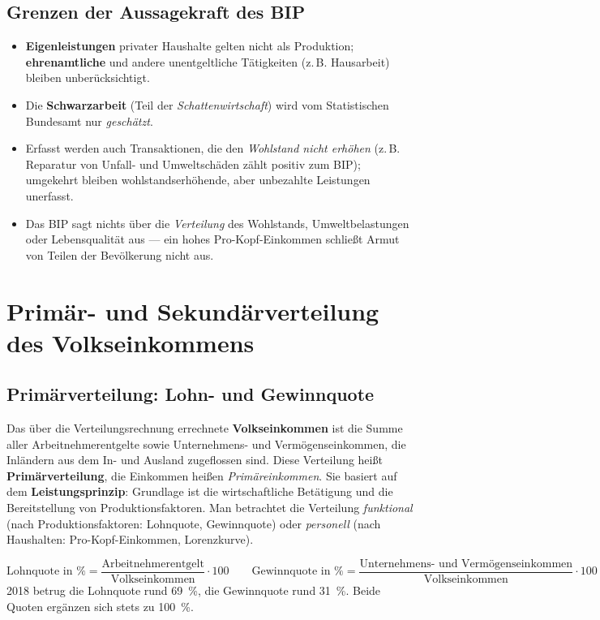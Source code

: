 \documentclass[11pt, a4paper]{article}
\begin{document}
\subsection{Grenzen der Aussagekraft des BIP}

\begin{itemize}
  \item \textbf{Eigenleistungen} privater Haushalte gelten nicht als Produktion;
    \textbf{ehrenamtliche} und andere unentgeltliche Tätigkeiten (z.\,B. Hausarbeit)
    bleiben unberücksichtigt.
  \item Die \textbf{Schwarzarbeit} (Teil der \emph{Schattenwirtschaft}) wird vom
    Statistischen Bundesamt nur \emph{geschätzt}.
  \item Erfasst werden auch Transaktionen, die den \emph{Wohlstand nicht erhöhen} (z.\,B.
    Reparatur von Unfall- und Umweltschäden zählt positiv zum BIP); umgekehrt bleiben
    wohlstandserhöhende, aber unbezahlte Leistungen unerfasst.
  \item Das BIP sagt nichts über die \emph{Verteilung} des Wohlstands, Umweltbelastungen
    oder Lebensqualität aus --- ein hohes Pro-Kopf-Einkommen schließt Armut von Teilen
    der Bevölkerung nicht aus.
\end{itemize}

\section{Primär- und Sekundärverteilung des Volkseinkommens}

\subsection{Primärverteilung: Lohn- und Gewinnquote}

Das über die Verteilungsrechnung errechnete \textbf{Volkseinkommen} ist die Summe aller
Arbeitnehmerentgelte sowie Unternehmens- und Vermögenseinkommen, die Inländern aus dem
In- und Ausland zugeflossen sind. Diese Verteilung heißt \textbf{Primärverteilung}, die
Einkommen heißen \emph{Primäreinkommen}. Sie basiert auf dem \textbf{Leistungsprinzip}:
Grundlage ist die wirtschaftliche Betätigung und die Bereitstellung von
Produktionsfaktoren. Man betrachtet die Verteilung \emph{funktional} (nach
Produktionsfaktoren: Lohnquote, Gewinnquote) oder \emph{personell} (nach Haushalten:
Pro-Kopf-Einkommen, Lorenzkurve).

\begin{merksatz}[title={\bfseries Formeln: Lohnquote und Gewinnquote}]
\[
\text{Lohnquote in \%} = \frac{\text{Arbeitnehmerentgelt}}{\text{Volkseinkommen}} \cdot 100
\qquad
\text{Gewinnquote in \%} = \frac{\text{Unternehmens- und Vermögenseinkommen}}{\text{Volkseinkommen}} \cdot 100
\]
2018 betrug die Lohnquote rund 69~\%, die Gewinnquote rund 31~\%. Beide Quoten ergänzen
sich stets zu 100~\%.
\end{merksatz}
\end{document}
